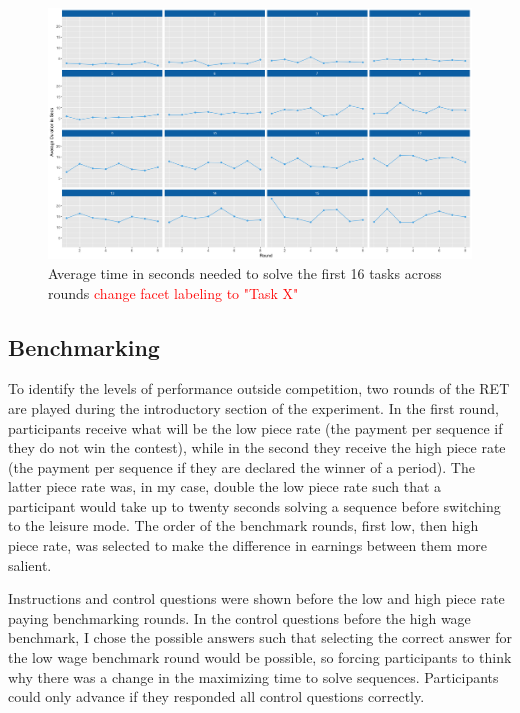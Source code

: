     \begin{figure}[h]
        \centering
        \includegraphics[width=\textwidth]{graphs/avg_time_per_task_round.png}
        \caption{Average time in seconds needed to solve the first 16 tasks across rounds \textcolor{red}{change facet labeling to "Task X"}}
        \label{fig:avg_time_task}
    \end{figure}
    
    
    \subsection{Benchmarking}
    \label{ss:benchmarking}
    
    To identify the levels of performance outside competition, two rounds of the RET are played during the introductory section of the experiment. In the first round, participants receive what will be the low piece rate (the payment per sequence if they do not win the contest), while in the second they receive the high piece rate (the payment per sequence if they are declared the winner of a period). The latter piece rate was, in my case, double the low piece rate such that a participant would take up to twenty seconds solving a sequence before switching to the leisure mode. The order of the benchmark rounds, first low, then high piece rate, was selected to make the difference in earnings between them more salient.
    
    Instructions and control questions were shown before the low and high piece rate paying benchmarking rounds. In the control questions before the high wage benchmark, I chose the possible answers such that selecting the correct answer for the low wage benchmark round would be possible, so forcing participants to think why there was a change in the maximizing time to solve sequences. Participants could only advance if they responded all control questions correctly.
    

